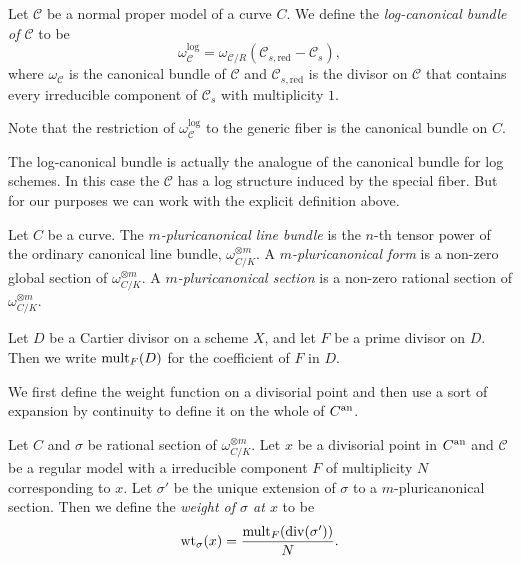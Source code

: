 \begin{definition}\label{def:log_cannonical_bundle}
	Let  $\mathscr C$ be a normal proper model of a curve $C $. 
	We define the \emph{log-canonical bundle of $\mathscr C$} to be \[
		\omega_{\mathscr C}^{\text{log}}  = \omega_{\mathscr C / R}(\mathscr C_{s, \text{red}} - \mathscr C_s)
	,\] 
	where $\omega_{\mathscr C}$ is the canonical bundle of $\mathscr C$ and $\mathscr C_{s, \text{red}}$ is the divisor on $\mathscr C$ that contains every irreducible component of $\mathscr C_s$ with multiplicity $1$.  
\end{definition}

Note that the restriction of $\omega_{\mathscr C}^{\text{log}}$ to the generic fiber is the canonical bundle on $C$. 

\begin{remark}
	The log-canonical bundle is actually the analogue of the canonical bundle for log schemes. 
	In this case the $\mathscr C$ has a log structure induced by the special fiber. 
	But for our purposes we can work with the explicit definition above. 
\end{remark}
\begin{definition}
	Let $C $ be a curve.
	The \emph{$m$-pluricanonical line bundle} is the $n$-th tensor power of the ordinary canonical line bundle, $\omega_{C / K}^{\otimes m }$. 
	A \emph{$m$-pluricanonical form}  is a non-zero global section of $\omega_{C / K}^{\otimes m }$. 
	A \emph{$m$-pluricanonical section} is a non-zero rational section of $\omega_{C / K}^{\otimes m }$.
\end{definition}
\begin{notation}
	Let $D$ be a Cartier divisor on a scheme $X$, and let $F$ be a prime divisor on $D$. 
	Then we write $\operatorname{mult}_{F}(D)$ for the coefficient of $F$ in $D$. 
\end{notation}

We first define the weight function on a divisorial point and then use a sort of expansion by continuity to define it on the whole of $C{}^{\text{an}}$. 
\begin{definition}\label{def:weight_function_divisorial_point}
	Let $C$ and $\sigma$ be rational section of $\omega_{C / K}^{\otimes m}$.
	Let $x$ be a divisorial point in $C{}^{\text{an}}$ and $\mathscr C$ be a regular model  with a irreducible component $F$ of multiplicity $N$ corresponding to $x$. 
	Let $\sigma'$ be the unique extension of $\sigma$ to a $m$-pluricanonical section. 
	Then we define the \emph{weight of $\sigma$ at $x$} to be \[
		\operatorname{wt}_\sigma(x) = \frac{\operatorname{mult}_F(\operatorname{div}(\sigma'))}{N}
	.\] 
\end{definition}

